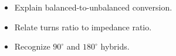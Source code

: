 \begin{objectives}
\begin{itemize}[leftmargin=1.4em,itemsep=2pt]
\item Explain balanced-to-unbalanced conversion.
\item Relate turns ratio to impedance ratio.
\item Recognize $90^{\circ}$ and $180^{\circ}$ hybrids.
\end{itemize}
\end{objectives}
